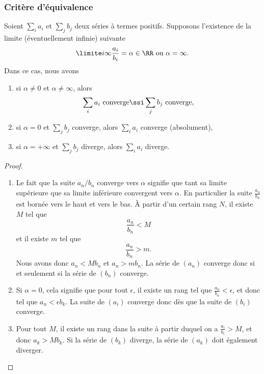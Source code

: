 \subsubsection{Critère d'équivalence}

\begin{proposition}
 Soient $\sum_i a_i$ et $\sum_j b_j$ deux séries à termes positifs. Supposons l'existence de la limite (éventuellement infinie) suivante
\begin{equation}
  \limite i \infty \frac{a_i}{b_i} = \alpha \in \RR \text{ ou $\alpha =
    \infty$.}
\end{equation}
Dans ce cas, nous avons
\begin{enumerate}
\item si $\alpha \neq 0$ et $\alpha\neq \infty$, alors
  \begin{equation}
    \sum_i a_i \text{~converge} \ssi \sum_j b_j\text{~converge,}
  \end{equation}
\item si $\alpha = 0$ et $\sum_j b_j$ converge, alors $\sum_i a_i$
  converge (absolument),
\item si $\alpha = +\infty$ et $\sum_j b_j$ diverge, alors $\sum_i
  a_i$ diverge.
\end{enumerate}
\end{proposition}

\begin{proof}
\begin{enumerate}
    \item
        Le fait que la suite $a_n/b_n$ converge vers $\alpha$ signifie que tant sa limite supérieure que sa limite inférieure convergent vers $\alpha$. En particulier la suite $\frac{ a_n }{ b_n }$ est bornée vers le haut et vers le bas. À partir d'un certain rang $N$, il existe $M$ tel que 
        \begin{equation}
            \frac{ a_n }{ b_n }<M
        \end{equation}
        et il existe $m$ tel que
        \begin{equation}
            \frac{ a_n }{ b_n }>m.
        \end{equation}
        Nous avons donc $a_n<Mb_n$ et $a_n>mb_n$. La série de $(a_n)$ converge donc si et seulement si la série de $(b_n)$ converge.
    \item
        Si $\alpha=0$, cela signifie que pour tout $\epsilon$, il existe un rang tel que $\frac{ a_n }{ b_n }<\epsilon$, et donc tel que $a_n<\epsilon b_k$. La suite de $(a_i)$ converge donc dès que la suite de $(b_i)$ converge.
    \item
        Pour tout $M$, il existe un rang dans la suite à partir duquel on a $\frac{ a_i }{ b_i }>M$, et donc $a_k>Mb_k$. Si la série de $(b_k)$ diverge, la série de $(a_k)$ doit également diverger.
\end{enumerate}
\end{proof}

